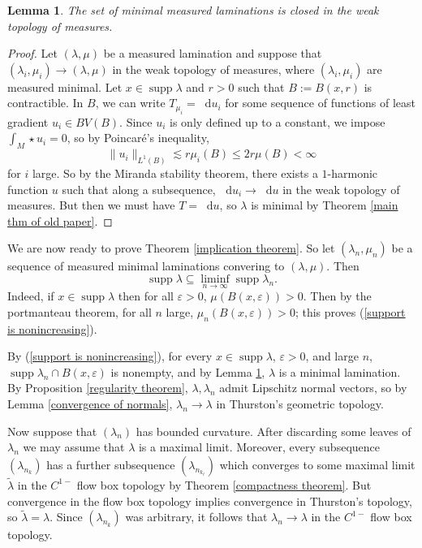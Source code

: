 \documentclass[final,12pt, leqno]{brownthesis}
\DeclareMathOperator{\supp}{supp}
\newcommand*\dif{\mathop{}\!\mathrm{d}}
\newtheorem{lemma}[theorem]{Lemma}
\theoremstyle{definition}
\numberwithin{equation}{section}
\begin{document}
\begin{lemma}\label{limits of measured geodesic lams are geodesic}
	The set of minimal measured laminations is closed in the weak topology of measures.
\end{lemma}
\begin{proof}
Let $(\lambda, \mu)$ be a measured lamination and suppose that $(\lambda_i, \mu_i) \to (\lambda, \mu)$ in the weak topology of measures, where $(\lambda_i, \mu_i)$ are measured minimal.
Let $x \in \supp \lambda$ and $r > 0$ such that $B := B(x, r)$ is contractible.
In $B$, we can write $T_{\mu_i} = \dif u_i$ for some sequence of functions of least gradient $u_i \in BV(B)$.
Since $u_i$ is only defined up to a constant, we impose $\int_M \star u_i = 0$, so by Poincar\'e's inequality,
$$\|u_i\|_{L^1(B)} \lesssim r\mu_i(B) \leq 2r \mu(B) < \infty$$
for $i$ large.
So by the Miranda stability theorem, there exists a $1$-harmonic function $u$ such that along a subsequence, $\dif u_i \to \dif u$ in the weak topology of measures.
But then we must have $T = \dif u$, so $\lambda$ is minimal by Theorem \ref{main thm of old paper}.
\end{proof}

We are now ready to prove Theorem \ref{implication theorem}.
So let $(\lambda_n, \mu_n)$ be a sequence of measured minimal laminations convering to $(\lambda, \mu)$.
Then
\begin{equation}\label{support is nonincreasing}
	\supp \lambda \subseteq \liminf_{n \to \infty} \supp \lambda_n.
\end{equation}
Indeed, if $x \in \supp \lambda$ then for all $\varepsilon > 0$, $\mu(B(x, \varepsilon)) > 0$.
Then by the portmanteau theorem, for all $n$ large, $\mu_n(B(x, \varepsilon)) > 0$; this proves (\ref{support is nonincreasing}).

By (\ref{support is nonincreasing}), for every $x \in \supp \lambda$, $\varepsilon > 0$, and large $n$, $\supp \lambda_n \cap B(x, \varepsilon)$ is nonempty, and by Lemma \ref{limits of measured geodesic lams are geodesic}, $\lambda$ is a minimal lamination.
By Proposition \ref{regularity theorem}, $\lambda, \lambda_n$ admit Lipschitz normal vectors, so by Lemma \ref{convergence of normals}, $\lambda_n \to \lambda$ in Thurston's geometric topology.

Now suppose that $(\lambda_n)$ has bounded curvature.
After discarding some leaves of $\lambda_n$ we may assume that $\lambda$ is a maximal limit.
Moreover, every subsequence $(\lambda_{n_k})$ has a further subsequence $(\lambda_{n_{k_\ell}})$ which converges to some maximal limit $\tilde \lambda$ in the $C^{1-}$ flow box topology by Theorem \ref{compactness theorem}.
But convergence in the flow box topology implies convergence in Thurston's topology, so $\tilde \lambda = \lambda$.
Since $(\lambda_{n_k})$ was arbitrary, it follows that $\lambda_n \to \lambda$ in the $C^{1-}$ flow box topology.
\end{document}
